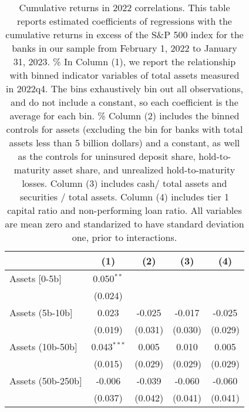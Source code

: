 
\begin{table}[htbp]
   \caption{\label{tab:dep_2022} Cumulative returns in 2022 correlations. This table reports estimated coefficients of regressions with the cumulative returns in excess of the S\&P 500 index for the banks in our sample from February 1, 2022 to January 31, 2023. \%
      In Column (1), we report the relationship with binned indicator variables of total assets measured in 2022q4. The bins exhaustively bin out all observations, and do not include a constant, so each coefficient is the average for each bin. \%
      Column (2) includes the binned controls for assets (excluding the bin for banks with total assets less than 5 billion dollars) and a constant, as well as the controls for uninsured deposit share, hold-to-maturity asset share, and unrealized hold-to-maturity losses.
      Column (3) includes  cash/ total assets and securities / total assets.
      Column (4) includes  tier 1 capital ratio and non-performing loan ratio.
       All variables are mean zero and standarized to have standard deviation one, prior to interactions.}
   \bigskip
   \centering
   \begin{adjustbox}{width = 1\textwidth, center}
      \begin{tabular}{lcccc}
         \toprule
                                                & (1)           & (2)          & (3)            & (4)\\  
         \midrule 
         Assets [0-5b]                          & 0.050$^{**}$  &              &                &   \\   
                                                & (0.024)       &              &                &   \\   
         Assets (5b-10b]                        & 0.023         & -0.025       & -0.017         & -0.025\\   
                                                & (0.019)       & (0.031)      & (0.030)        & (0.029)\\   
         Assets (10b-50b]                       & 0.043$^{***}$ & 0.005        & 0.010          & 0.005\\   
                                                & (0.015)       & (0.029)      & (0.029)        & (0.029)\\   
         Assets (50b-250b]                      & -0.006        & -0.039       & -0.060         & -0.060\\   
                                                & (0.037)       & (0.042)      & (0.041)        & (0.041)\\   

\end{tabular}
\end{adjustbox}
\end{table}
